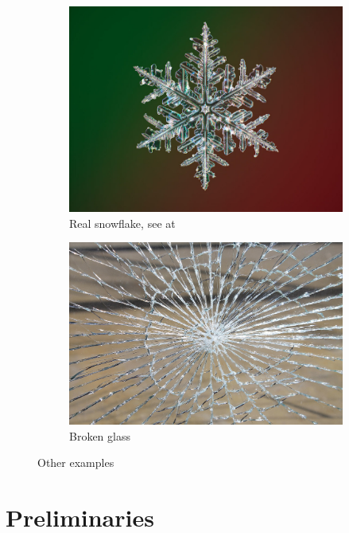 \documentclass[12pt,a4paper]{scrartcl}
\numberwithin{equation}{subsection}
\newcommand{\1}{\mathbbm{1}}
\numberwithin{equation}{section}
\theoremstyle{definition}
\begin{document}
\begin{figure}
	\begin{subfigure}[b]{.45\textwidth}
		\includegraphics[width=1\linewidth]{images/snowflake.jpg}
		\caption{Real snowflake, see at \cite{snowflake}} 
	\end{subfigure}
	\begin{subfigure}[b]{.45\textwidth}
		\includegraphics[width=.8\linewidth]{images/glass-break.jpg}
		\caption{Broken glass} 
	\end{subfigure}
	\caption{Other examples}
	\label{other}
\end{figure}




\newpage


\section{Preliminaries} \label{prelim}
\end{document}

